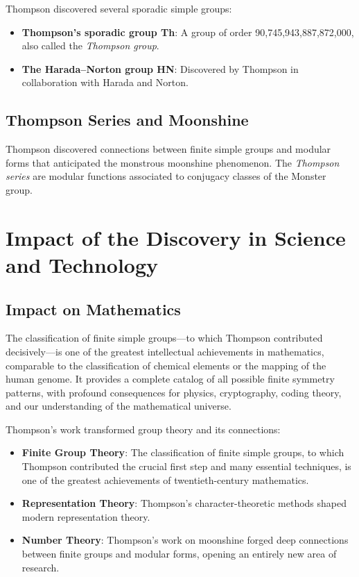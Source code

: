 Thompson discovered several sporadic simple groups:
\begin{itemize}
\item \textbf{Thompson's sporadic group Th}: A group of order 90,745,943,887,872,000, also called the \emph{Thompson group}.
\item \textbf{The Harada--Norton group HN}: Discovered by Thompson in collaboration with Harada and Norton.
\end{itemize}

\subsection{Thompson Series and Moonshine}

Thompson discovered connections between finite simple groups and modular forms that anticipated the monstrous moonshine phenomenon. The \emph{Thompson series} are modular functions associated to conjugacy classes of the Monster group.

\section{Impact of the Discovery in Science and Technology}

\subsection{Impact on Mathematics}

\begin{whyitmatters}
The classification of finite simple groups---to which Thompson contributed decisively---is one of the greatest intellectual achievements in mathematics, comparable to the classification of chemical elements or the mapping of the human genome. It provides a complete catalog of all possible finite symmetry patterns, with profound consequences for physics, cryptography, coding theory, and our understanding of the mathematical universe.
\end{whyitmatters}

Thompson's work transformed group theory and its connections:

\begin{itemize}
\item \textbf{Finite Group Theory}: The classification of finite simple groups, to which Thompson contributed the crucial first step and many essential techniques, is one of the greatest achievements of twentieth-century mathematics.

\item \textbf{Representation Theory}: Thompson's character-theoretic methods shaped modern representation theory.

\item \textbf{Number Theory}: Thompson's work on moonshine forged deep connections between finite groups and modular forms, opening an entirely new area of research.
\end{itemize}

